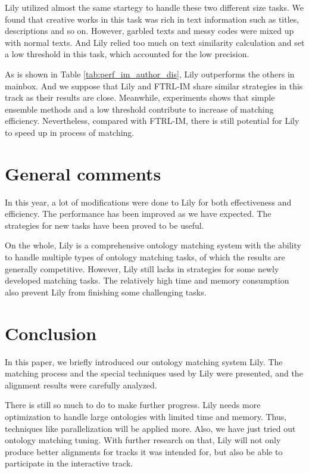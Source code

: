\documentclass{llncs}
\begin{document}
Lily utilized almost the same startegy to handle these two different size tasks. 
We found that creative works in this task was rich in text information such as titles, descriptions and so on. 
However, garbled texts and messy codes were mixed up with normal texts. 
And Lily relied too much on text similarity calculation and set a low threshold in this task, which accounted for the low precision.\par

As is shown in Table \ref{tab:perf_im_author_dis},
Lily outperforms the others in mainbox. 
And we suppose that Lily and FTRL-IM share similar strategies in this track as their results are close.
Meanwhile, experiments shows that simple ensemble methods and a low threshold contribute to increase of matching efficiency.
Nevertheless, compared with FTRL-IM, there is still potential for Lily to speed up in process of matching. \par


\section{General comments}
In this year, a lot of modifications were done to Lily for both effectiveness and efficiency. The performance has been improved as we have expected. The strategies for new tasks have been proved to be useful. \par
On the whole, Lily is a comprehensive ontology matching system with the ability to handle multiple types of ontology matching tasks, of which the results are generally competitive. However, Lily still lacks in strategies for some newly developed matching tasks. The relatively high time and memory consumption also prevent Lily from finishing some challenging tasks. \par

\section{Conclusion}
In this paper, we briefly introduced our ontology matching system Lily. The matching process and the special techniques used by Lily were presented, and the alignment results were carefully analyzed. \par
There is still so much to do to make further progress. Lily needs more optimization to handle large ontologies with limited time and memory. Thus, techniques like parallelization will be applied more. Also, we have just tried out ontology matching tuning. With further research on that, Lily will not only produce better alignments for tracks it was intended for, but also be able to participate in the interactive track. \par
\end{document}
